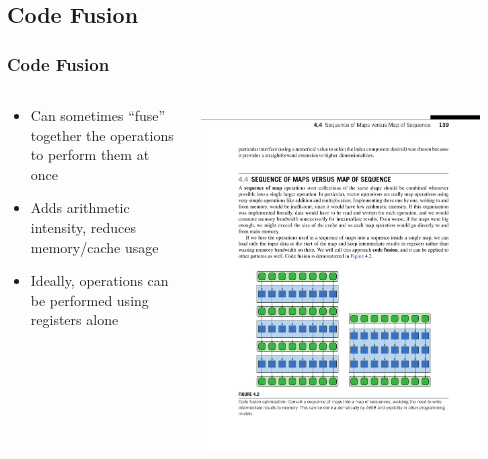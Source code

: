 \documentclass[xcolor=dvipsnames]{beamer}
\begin{document}
	\subsection{Code Fusion}
		\begin{frame} \frametitle{Code Fusion}
      \begin{columns}
        \begin{column}{0.48\textwidth}
          \begin{itemize}
            \item
              Can sometimes ``fuse'' together the operations to perform them at
              once
            \item
              Adds arithmetic intensity, reduces memory/cache usage
            \item
              Ideally, operations can be performed using registers alone
          \end{itemize}
        \end{column}
        \begin{column}{0.48\textwidth}
          \centering
          \includegraphics[width=0.9\textwidth]{images/figure-4-2-2}
        \end{column}
      \end{columns}
		\end{frame}
\end{document}
